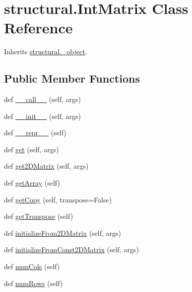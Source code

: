 \hypertarget{classstructural_1_1_int_matrix}{}\section{structural.\+Int\+Matrix Class Reference}
\label{classstructural_1_1_int_matrix}


Inherits \hyperlink{classstructural_1_1__object}{structural.\+\_\+object}.

\subsection*{Public Member Functions}
\begin{DoxyCompactItemize}
\item 
def \hyperlink{classstructural_1_1_int_matrix_a0bf7171db37b304a36e15361292af7be}{\+\_\+\+\_\+call\+\_\+\+\_\+} (self, args)
\item 
def \hyperlink{classstructural_1_1_int_matrix_a1f9dbf8658e1a20a3047a8ae5115d563}{\+\_\+\+\_\+init\+\_\+\+\_\+} (self, args)
\item 
def \hyperlink{classstructural_1_1_int_matrix_a53cedbc183f1494fd7220e22276b621c}{\+\_\+\+\_\+repr\+\_\+\+\_\+} (self)
\item 
def \hyperlink{classstructural_1_1_int_matrix_ac69c5fb83484e058f028efc153dfa133}{get} (self, args)
\item 
def \hyperlink{classstructural_1_1_int_matrix_a2605e429ad10efa36ea8879e701f83a6}{get2\+D\+Matrix} (self, args)
\item 
def \hyperlink{classstructural_1_1_int_matrix_adb7407d72b3d4ce6095d9e0256467cd8}{get\+Array} (self)
\item 
def \hyperlink{classstructural_1_1_int_matrix_a23613b29aa93e3a2fada9348760f2228}{get\+Copy} (self, transpose=False)
\item 
def \hyperlink{classstructural_1_1_int_matrix_a987dc4ea1c88b4428332e98255515357}{get\+Transpose} (self)
\item 
def \hyperlink{classstructural_1_1_int_matrix_a9fe6037ad786a9a4a394d180aecfddda}{initialize\+From2\+D\+Matrix} (self, args)
\item 
def \hyperlink{classstructural_1_1_int_matrix_a794f428c8d9da4c6cfb0f76def8cdbf0}{initialize\+From\+Const2\+D\+Matrix} (self, args)
\item 
def \hyperlink{classstructural_1_1_int_matrix_afcde9b6afa7569bef2bba3ad73d7b5d3}{num\+Cols} (self)
\item 
def \hyperlink{classstructural_1_1_int_matrix_acd82a29a1d8762a996df2982464d5cdf}{num\+Rows} (self)

\end{DoxyCompactItemize}
